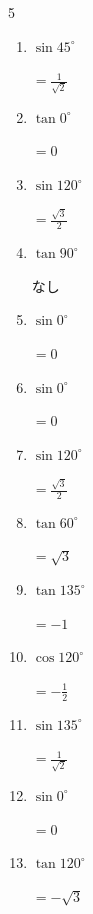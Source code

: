 \begin{multicols}{5}
\begin{enumerate}
  \item $\displaystyle \sin{45^\circ}$

        $\displaystyle =\frac{1}{\sqrt{2}}$

  \item $\displaystyle \tan{0^\circ}$

        $\displaystyle =0$

  \item $\displaystyle \sin{120^\circ}$

        $\displaystyle =\frac{\sqrt{3}}{2}$

  \item $\displaystyle \tan{90^\circ}$

        $\displaystyle なし$

  \item $\displaystyle \sin{0^\circ}$

        $\displaystyle =0$

  \item $\displaystyle \sin{0^\circ}$

        $\displaystyle =0$

  \item $\displaystyle \sin{120^\circ}$

        $\displaystyle =\frac{\sqrt{3}}{2}$

  \item $\displaystyle \tan{60^\circ}$

        $\displaystyle =\sqrt{3}$

  \item $\displaystyle \tan{135^\circ}$

        $\displaystyle =-1$

  \item $\displaystyle \cos{120^\circ}$

        $\displaystyle =-\frac{1}{2}$

\columnbreak %

  \item $\displaystyle \sin{135^\circ}$

        $\displaystyle =\frac{1}{\sqrt{2}}$

  \item $\displaystyle \sin{0^\circ}$

        $\displaystyle =0$

  \item $\displaystyle \tan{120^\circ}$

        $\displaystyle =-\sqrt{3}$


\end{enumerate}
\end{multicols}
